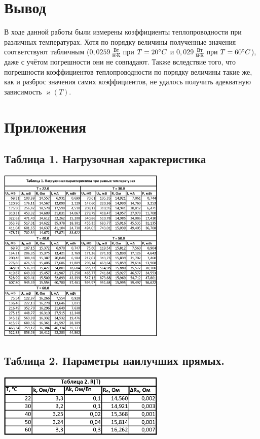\documentclass[15pt,a5paper,reqno]{article}
\renewcommand{\kappa}{\varkappa}
\begin{document}
\section{Вывод}
    
    В ходе данной работы были измерены коэффициенты теплопроводности при различных температурах. Хотя по порядку величины полученные значения соответствуют табличным ($0,0259\ \frac{\text{Вт}}{\text{м}\cdot\text{К}}$ при $T = 20\degree C$ и $0,029\ \frac{\text{Вт}}{\text{м}\cdot\text{К}}$ при $T = 60\degree C$), даже с учётом погрешности они не совпадают. Также вследствие того, что погрешности коэффициентов теплопроводности по порядку величины такие же, как и разброс значения самих коэффициентов, не удалось получить адекватную зависимость $\kappa(T)$.

\newpage
\section{Приложения}

    \subsection{Таблица 1. Нагрузочная характеристика}
    \begin{center}
        \includegraphics[width=8cm]{Таблица 1.jpg}
    \end{center}
    
    \subsection{Таблица 2. Параметры наилучших прямых.}
    \begin{center}
        \includegraphics[width = 8cm]{Таблицы 2.jpg}
    \end{center}
    
\end{document}
